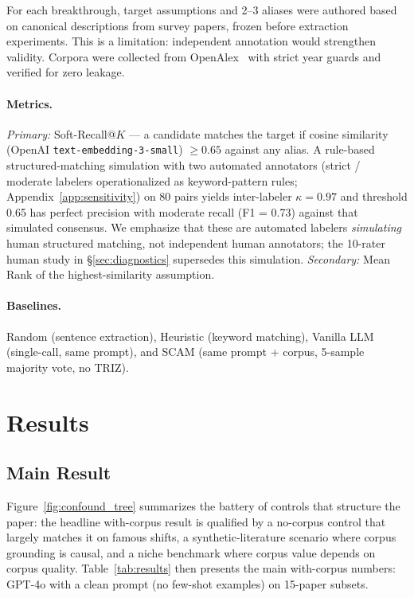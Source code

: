 \documentclass[11pt]{article}
\begin{document}
For each breakthrough, target assumptions and 2--3 aliases were authored based on canonical descriptions from survey papers, frozen before extraction experiments. This is a limitation: independent annotation would strengthen validity. Corpora were collected from OpenAlex~\cite{priem2022openalex} with strict year guards and verified for zero leakage.

\paragraph{Metrics.}
\emph{Primary:} Soft-Recall@$K$ --- a candidate matches the target if cosine similarity (OpenAI \texttt{text-embedding-3-small}) $\geq 0.65$ against any alias. A rule-based structured-matching simulation with two automated annotators (strict / moderate labelers operationalized as keyword-pattern rules; Appendix~\ref{app:sensitivity}) on 80 pairs yields inter-labeler $\kappa = 0.97$ and threshold 0.65 has perfect precision with moderate recall (F1 = 0.73) against that simulated consensus. We emphasize that these are automated labelers \emph{simulating} human structured matching, not independent human annotators; the 10-rater human study in \S\ref{sec:diagnostics} supersedes this simulation. \emph{Secondary:} Mean Rank of the highest-similarity assumption.

\paragraph{Baselines.}
Random (sentence extraction), Heuristic (keyword matching), Vanilla LLM (single-call, same prompt), and SCAM (same prompt + corpus, 5-sample majority vote, no TRIZ).

\section{Results}

\subsection{Main Result}\label{sec:main}

Figure~\ref{fig:confound_tree} summarizes the battery of controls that structure the paper: the headline with-corpus result is qualified by a no-corpus control that largely matches it on famous shifts, a synthetic-literature scenario where corpus grounding is causal, and a niche benchmark where corpus value depends on corpus quality. Table~\ref{tab:results} then presents the main with-corpus numbers: GPT-4o with a clean prompt (no few-shot examples) on 15-paper subsets.
\end{document}

